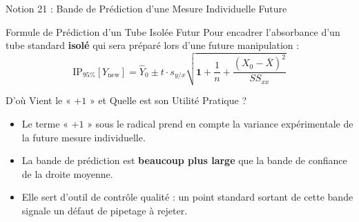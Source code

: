 \documentclass[aspectratio=169,10pt]{beamer}
\begin{document}
\begin{frame}{Notion 21 : Bande de Prédiction d'une Mesure Individuelle Future}
  \begin{conceptbox}{Formule de Prédiction d'un Tube Isolée Futur}
    \footnotesize
    Pour encadrer l'absorbance d'un tube standard \textbf{isolé} qui sera préparé lors d'une future manipulation :
    \begin{equation*}
      \text{IP}_{95\%}[Y_{\text{new}}] = \hat{Y}_0 \pm t \cdot s_{y/x} \sqrt{\mathbf{1} + \frac{1}{n} + \frac{(X_0 - \bar{X})^2}{SS_{xx}}}
    \end{equation*}
  \end{conceptbox}
  \vspace{1mm}
  \begin{biobox}{D'où Vient le « $+1$ » et Quelle est son Utilité Pratique ?}
    \footnotesize
    \begin{itemize}
      \item Le terme « $+1$ » sous le radical prend en compte la variance expérimentale de la future mesure individuelle.
      \item La bande de prédiction est \textbf{beaucoup plus large} que la bande de confiance de la droite moyenne.
      \item Elle sert d'outil de contrôle qualité : un point standard sortant de cette bande signale un défaut de pipetage à rejeter.
    \end{itemize}
  \end{biobox}
\end{frame}
\end{document}
